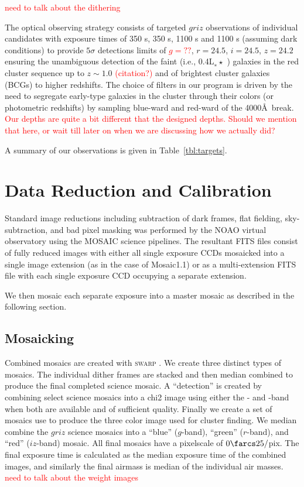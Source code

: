 \documentclass[apj, revtex4-1]{emulateapj}
\newcommand{\editorial}[1]{\textcolor{red}{#1}}
\begin{document}
\editorial{need to talk about the dithering}

The optical observing strategy consists of targeted $griz$ observations of individual candidates with exposure times of 350 s, 350 s, 1100 s and 1100 s (assuming dark conditions) to provide $5\sigma$ detections limits of \editorial{$g=??$}, $r = 24.5$, $i = 24.5$, $z = 24.2$ ensuring the unambiguous detection of the faint (i.e., 0.4L$_∗\star$ ) galaxies in the red cluster sequence up to $z \sim 1.0$ \editorial{(citation?)} and of brightest cluster galaxies (BCGs) to higher redshifts. The choice of filters in our program is driven by the need to segregate early-type galaxies in the cluster through their colors (or photometric redshifts) by sampling blue-ward and red-ward of the 4000\AA\ break. \editorial{Our depths are quite a bit different that the designed depths. Should we mention that here, or wait till later on when we are discussing how we actually did?}

A summary of our observations is given in Table~\ref{tbl:targets}.

\section{Data Reduction and Calibration}\label{sec:data reduction}
Standard image reductions including subtraction of dark frames, flat fielding, sky-subtraction, and bad pixel masking was performed by the NOAO virtual observatory using the MOSAIC \citep{Valdes2007} science pipelines. The resultant FITS files consist of fully reduced images with either all single exposure CCDs mosaicked into a single image extension (as in the case of Mosaic1.1) or as a multi-extension FITS file with each single exposure CCD occupying a separate extension.

We then mosaic each separate exposure into a master mosaic as described in the following section.

\subsection{Mosaicking}\label{sec:mosaicks}
Combined mosaics are created with \textsc{swarp} \citep{Bertin2002}. We create three distinct types of mosaics. The individual dither frames are stacked and then median combined to produce the final completed science mosaic. A ``detection'' is created by combining select science mosaics into a chi2 image using either the \sdssi- and \sdssz-band when both are available and of sufficient quality. Finally we create a set of mosaics use to produce the three color image used for cluster finding. We median combine the $griz$ science mosaics into a ``blue'' ($g$-band), ``green'' ($r$-band), and ``red'' ($iz$-band) mosaic. All final mosaics have a pixelscale of $0\farcs25/$pix. The final exposure time is calculated as the median exposure time of the combined images, and similarly the final airmass is median of the individual air masses. \editorial{need to talk about the weight images}
\end{document}
